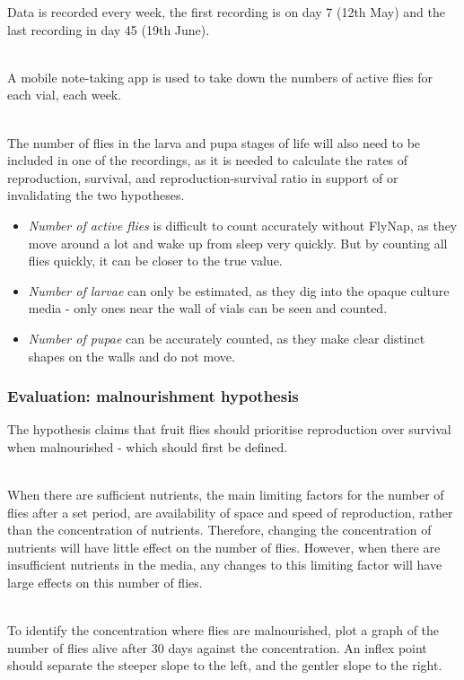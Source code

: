 \documentclass{article}
\begin{document}
Data is recorded every week, the first recording is on day 7 (12th May) and the last recording in day 45 (19th June).

\noindent\\
A mobile note-taking app is used to take down the numbers of active flies for each vial, each week.

\noindent\\
The number of flies in the larva and pupa stages of life will also need to be included in one of the recordings, as it is needed to calculate the rates of reproduction, survival, and reproduction-survival ratio in support of or invalidating the two hypotheses.

\begin{itemize}
    \item \emph{Number of active flies} is difficult to count accurately without FlyNap, as they move around a lot and wake up from sleep very quickly. But by counting all flies quickly, it can be closer to the true value.
    \item \emph{Number of larvae} can only be estimated, as they dig into the opaque culture media - only ones near the wall of vials can be seen and counted.
    \item \emph{Number of pupae} can be accurately counted, as they make clear distinct shapes on the walls and do not move.
\end{itemize}

\subsubsection{Evaluation: malnourishment hypothesis}

The hypothesis claims that fruit flies should prioritise reproduction over survival when malnourished - which should first be defined.

\noindent\\
When there are sufficient nutrients, the main limiting factors for the number of flies after a set period, are availability of space and speed of reproduction, rather than the concentration of nutrients. Therefore, changing the concentration of nutrients will have little effect on the number of flies. However, when there are insufficient nutrients in the media, any changes to this limiting factor will have large effects on this number of flies.

\noindent\\
To identify the concentration where flies are malnourished, plot a graph of the number of flies alive after 30 days against the concentration. An inflex point should separate the steeper slope to the left, and the gentler slope to the right.
\end{document}
